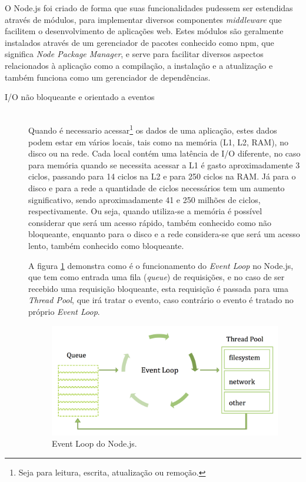     O Node.js foi criado de forma que suas funcionalidades pudessem ser estendidas através de módulos, para implementar diversos componentes \textit{middleware} que facilitem o desenvolvimento de aplicações web. Estes módulos são geralmente instalados através de um gerenciador de pacotes conhecido como npm, que significa \textit{Node Package Manager}, e serve para facilitar diversos aspectos relacionados à aplicação como a compilação, a instalação e a atualização e também funciona como um gerenciador de dependências.

\begin{description}
\item[I/O não bloqueante e orientado a eventos] \hfill \\
Quando é necessario acessar\footnote{Seja para leitura, escrita, atualização ou remoção.} os dados de uma aplicação, estes dados podem estar em vários locais, tais como na memória (L1, L2, RAM), no disco ou na rede. Cada local contém uma latência de I/O diferente, no caso para memória quando se necessita acessar a L1 é gasto aproximadamente  3 ciclos, passando para 14 ciclos na L2 e para 250 ciclos na RAM. Já para o disco e para a rede a quantidade de ciclos necessários tem um aumento significativo, sendo aproximadamente 41 e 250 milhões de ciclos, respectivamente. Ou seja, quando utiliza-se a memória é possível considerar que será um acesso rápido, também conhecido como não bloqueante, enquanto para o disco e a rede considera-se que será um acesso lento, também conhecido como bloqueante.

A figura \ref{fig:Event Loop do Node.js} demonstra como é o funcionamento do \textit{Event Loop} no Node.js, que tem como entrada uma fila (\textit{queue}) de requisições, e no caso de ser recebido uma requisição bloqueante, esta requisição é passada para uma \textit{Thread Pool}, que irá tratar o evento, caso contrário o evento é tratado no próprio \textit{Event Loop}.

\begin{figure}[ht]
\centering
\includegraphics[scale=0.3]{images/node_event_loop.png}
\caption{Event Loop do Node.js. \cite{nodeMeet}}
\label{fig:Event Loop do Node.js}
\end{figure}


\end{description}
